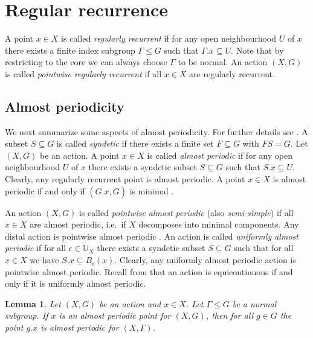 \documentclass[12pt, reqno]{amsart}
\newtheorem{lemma}[theorem]{Lemma}
\theoremstyle{definition}
\theoremstyle{remark}
\numberwithin{equation}{section}
\theoremstyle{theorem}
\theoremstyle{remark}
\begin{document}
\section{Regular recurrence}
\label{sec:RegularRecurrence}
A point $x\in X$ is called \emph{regularly recurrent} if for any open neighbourhood $U$ of $x$ there exists a finite index subgroup $\Gamma\leq G$ such that $\Gamma.x\subseteq U$. 
Note that by restricting to the core we can always choose $\Gamma$ to be normal. 
An action $(X,G)$ is called \emph{pointwise regularly recurrent} if all $x\in X$ are regularly recurrent. 

\subsection{Almost periodicity}
\label{subsec:RegularRecurrence_almostPeriodicity}
We next summarize some aspects of almost periodicity. For further details see \cite{auslander1988minimal}. 
A subset $S\subseteq G$ is called \emph{syndetic} if there exists a finite set $F\subseteq G$ with $FS=G$. 
Let $(X,G)$ be an action. 
A point $x\in X$ is called \emph{almost periodic} if for any open neighbourhood $U$ of $x$ there exists a syndetic subset $S\subseteq G$ such that $S.x\subseteq U$. 
Clearly, any regularly recurrent point is almost periodic. 
A point $x\in X$ is almost periodic if and only if $(\overline{G.x},G)$ is minimal \cite[Theorem~1.7]{auslander1988minimal}. 

An action $(X,G)$ is called \emph{pointwise almost periodic} (also \emph{semi-simple}) if all $x\in X$ are almost periodic, i.e.\ if $X$ decomposes into minimal components. Any distal action is pointwise almost periodic \cite[Corollary~5.4]{auslander1988minimal}. 
An action is called \emph{uniformly almost periodic} if for all $\epsilon\in \mathbb{U}_X$ there exists a syndetic subset $S\subseteq G$ such that for all $x\in X$ we have $S.x\subseteq B_\epsilon(x)$. 
Clearly, any uniformly almost periodic action is pointwise almost periodic. 
Recall from \cite[Theorem~2.2]{auslander1988minimal} that an action is equicontinuous if and only if it is uniformly almost periodic. 

\begin{lemma}\cite[Lemma~1.12]{auslander1988minimal}
\label{lem:normalSubgroupMinimalComponents}
    Let $(X,G)$ be an action and $x\in X$. 
    Let $\Gamma\leq G$ be a normal subgroup. 
    If $x$ is an almost periodic point for $(X,G)$, then for all $g\in G$ the point $g.x$ is almost periodic for $(X,\Gamma)$.
\end{lemma}
\end{document}
